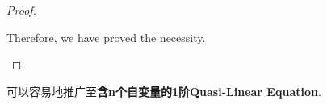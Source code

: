 \begin{thm}
\begin{proof}
\begin{itemize}
				\vspace*{1em}
				
				Therefore, we have proved the necessity. 
			\end{itemize}
		\end{proof}
		
		\vspace*{4em}
		
		\begin{rmk}
			可以容易地推广至\textbf{含n个自变量的1阶Quasi-Linear Equation}. 
		\end{rmk}
	\end{thm}



	\ifx\allfiles\undefined

\fi